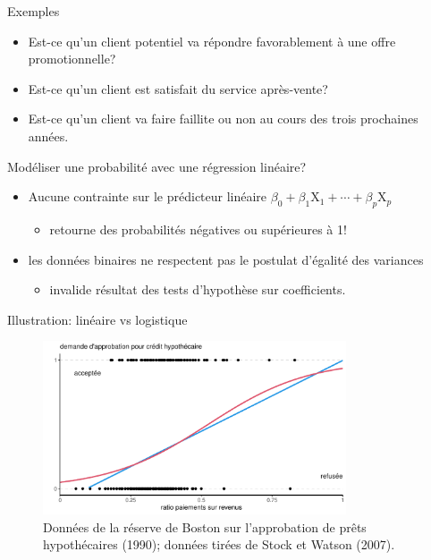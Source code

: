 \documentclass[
  ignorenonframetext,
]{beamer}
\providecommand{\tightlist}{%
  \setlength{\itemsep}{0pt}\setlength{\parskip}{0pt}}\usepackage{longtable,booktabs,array}
\begin{document}
\begin{frame}{Exemples}
\protect\hypertarget{exemples}{}
\begin{itemize}
\tightlist
\item
  Est-ce qu'un client potentiel va répondre favorablement à une offre
  promotionnelle?
\item
  Est-ce qu'un client est satisfait du service après-vente?
\item
  Est-ce qu'un client va faire faillite ou non au cours des trois
  prochaines années.
\end{itemize}
\end{frame}

\begin{frame}{Modéliser une probabilité avec une régression linéaire?}
\protect\hypertarget{moduxe9liser-une-probabilituxe9-avec-une-ruxe9gression-linuxe9aire}{}
\begin{itemize}
\tightlist
\item
  Aucune contrainte sur le prédicteur linéaire
  \(\beta_0 + \beta_1 \mathrm{X}_1 + \cdots + \beta_p \mathrm{X}_p\)

  \begin{itemize}
  \tightlist
  \item
    retourne des probabilités négatives ou supérieures à 1!
  \end{itemize}
\item
  les données binaires ne respectent pas le postulat d'égalité des
  variances

  \begin{itemize}
  \tightlist
  \item
    invalide résultat des tests d'hypothèse sur coefficients.
  \end{itemize}
\end{itemize}
\end{frame}

\begin{frame}{Illustration: linéaire vs logistique}
\protect\hypertarget{illustration-linuxe9aire-vs-logistique}{}
\begin{figure}

{\centering \includegraphics[width=0.8\textwidth,height=\textheight]{MATH60602-diapos6_files/figure-beamer/fig-demandecredit-1.pdf}

}

\caption{\label{fig-demandecredit}Données de la réserve de Boston sur
l'approbation de prêts hypothécaires (1990); données tirées de Stock et
Watson (2007).}

\end{figure}
\end{frame}
\end{document}

